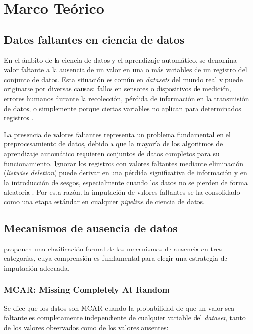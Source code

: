 \chapter{Marco Teórico}

\section{Datos faltantes en ciencia de datos}

En el ámbito de la ciencia de datos y el aprendizaje automático, se denomina
valor faltante a la ausencia de un valor en una o más variables de un registro
del conjunto de datos. Esta situación es común en \textit{datasets} del mundo real y puede originarse por diversas causas: fallos en sensores o dispositivos de
medición, errores humanos durante la recolección, pérdida de información en
la transmisión de datos, o simplemente porque ciertas variables no aplican
para determinados registros \parencite{little2019}.

La presencia de valores faltantes representa un problema fundamental en el
preprocesamiento de datos, debido a que la mayoría de los algoritmos de
aprendizaje automático requieren conjuntos de datos completos para su
funcionamiento. Ignorar los registros con valores faltantes mediante
eliminación (\textit{listwise deletion}) puede derivar en una pérdida
significativa de información y en la introducción de sesgos, especialmente
cuando los datos no se pierden de forma aleatoria \parencite{garcia2017}.
Por esta razón, la imputación de valores faltantes se ha consolidado como
una etapa estándar en cualquier \textit{pipeline} de ciencia de datos.

\section{Mecanismos de ausencia de datos}

\textcite{little2019} proponen una clasificación formal de
los mecanismos de ausencia en tres categorías, cuya comprensión es
fundamental para elegir una estrategia de imputación adecuada.

\subsection{MCAR: Missing Completely At Random}

Se dice que los datos son MCAR cuando la probabilidad de que un valor sea
faltante es completamente independiente de cualquier variable del \textit{dataset},
tanto de los valores observados como de los valores ausentes:

